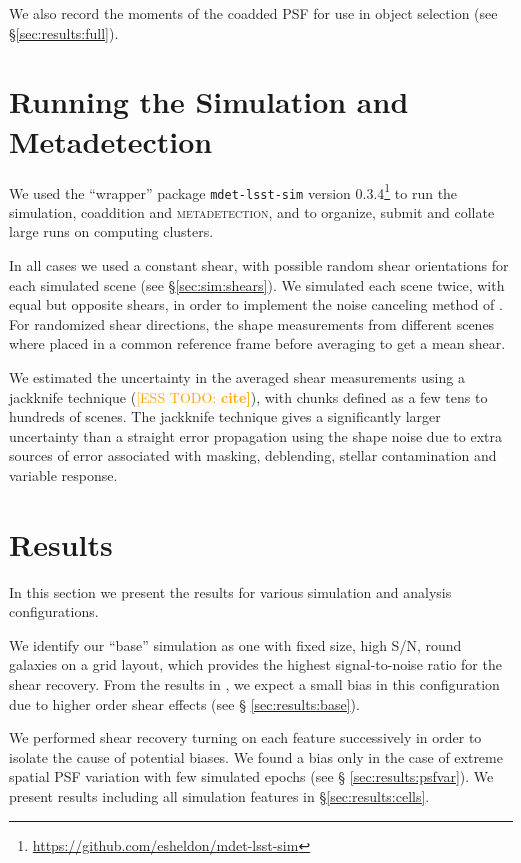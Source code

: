 \documentclass[twocolumn,twocolappendix,astrosym]{openjournal}
\newcommand{\esstodo}[1]{\textcolor{orange}{[ESS TODO: \bf #1]}}
\newcommand{\mdet}{\textsc{metadetection}}
\begin{document}
We also record the moments of the coadded PSF for use in object selection (see
\S \ref{sec:results:full}).


\section{Running the Simulation and Metadetection} \label{sec:running}

We used the ``wrapper'' package \texttt{mdet-lsst-sim} version
0.3.4\footnote{\url{https://github.com/esheldon/mdet-lsst-sim}} to run the
simulation, coaddition and \mdet, and to organize, submit and collate large
runs on computing clusters.

In all cases we used a constant shear, with possible random shear orientations
for each simulated scene (see \S \ref{sec:sim:shears}).  We simulated each
scene twice, with equal but opposite shears, in order to implement the noise
canceling method of \cite{pujol2019}.  For randomized shear directions, the
shape measurements from different scenes where placed in a common reference
frame before averaging to get a mean shear.

We estimated the uncertainty in the averaged shear measurements using a
jackknife technique (\esstodo{cite}), with chunks defined as a few tens to hundreds of scenes.
The jackknife technique gives a significantly larger uncertainty than a
straight error propagation using the shape noise due to extra sources of error
associated with masking, deblending, stellar contamination and variable
response.

\section{Results} \label{sec:results}

In this section we present the results for various simulation and analysis
configurations.

We identify our ``base'' simulation as one with fixed size, high S/N, round
galaxies on a grid layout, which provides the highest signal-to-noise ratio for
the shear recovery. From the results in \citet{mdet20}, we expect a small bias
in this configuration due to higher order shear effects (see \S
\ref{sec:results:base}).

We performed shear recovery turning on each feature successively in order to
isolate the cause of potential biases.  We found a bias only in the case of
extreme spatial PSF variation with few simulated epochs (see \S
\ref{sec:results:psfvar}).  We present results including all simulation
features in \S \ref{sec:results:cells}.
\end{document}
